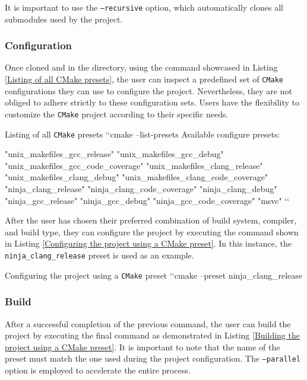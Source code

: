 \documentclass[english, ing, kiv, he, iso690numb, pdf]{fasthesis}
\begin{document}
	\begin{important}
		It is important to use the \texttt{--recursive} option, which automatically clones all submodules used by the project.
	\end{important}
	
	\subsubsection{Configuration}
	
	Once cloned and in the directory, using the command showcased in Listing \ref{Listing of all CMake presets}, the user can inspect a predefined set of \texttt{CMake} configurations they can use to configure the project. Nevertheless, they are not obliged to adhere strictly to these configuration sets. Users have the flexibility to customize the \texttt{CMake} project according to their specific needs.
	
\begin{console}{Listing of all \texttt{CMake} presets\label{Listing of all CMake presets}}
`\uxprompt`cmake --list-presets
Available configure presets:

"unix_makefiles_gcc_release"
"unix_makefiles_gcc_debug"
"unix_makefiles_gcc_code_coverage"
"unix_makefiles_clang_release"
"unix_makefiles_clang_debug"
"unix_makefiles_clang_code_coverage"
"ninja_clang_release"
"ninja_clang_code_coverage"
"ninja_clang_debug"
"ninja_gcc_release"
"ninja_gcc_debug"
"ninja_gcc_code_coverage"
"msvc"
`\uxprompt`
\end{console}
	
	After the user has chosen their preferred combination of build system, compiler, and build type, they can configure the project by executing the command shown in Listing \ref{Configuring the project using a CMake preset}. In this instance, the \texttt{ninja\_clang\_release} preset is used as an example.
	
\begin{console}{Configuring the project using a \texttt{CMake} preset\label{Configuring the project using a CMake preset}}
`\uxprompt`cmake --preset ninja_clang_release
\end{console}
	
	\subsubsection{Build}
	
	After a successful completion of the previous command, the user can build the project by executing the final command as demonstrated in Listing \ref{Building the project using a CMake preset}. It is important to note that the name of the preset must match the one used during the project configuration. The \texttt{--parallel} option is employed to accelerate the entire process.
	
\end{document}
